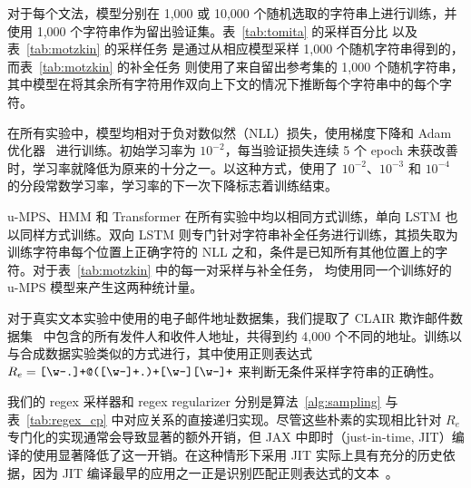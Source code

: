 \documentclass[twoside]{article}
\begin{document}
对于每个文法，模型分别在 1,000 或 10,000 个随机选取的字符串上进行训练，并使用 1,000 个字符串作为留出验证集。表~\ref{tab:tomita} 的采样百分比
以及表~\ref{tab:motzkin} 的采样任务
是通过从相应模型采样 1,000 个随机字符串得到的，而表~\ref{tab:motzkin} 的补全任务
则使用了来自留出参考集的 1,000 个随机字符串，其中模型在将其余所有字符用作双向上下文的情况下推断每个字符串中的每个字符。

在所有实验中，模型均相对于负对数似然（NLL）损失，使用梯度下降和 Adam 优化器~\citep{kingma2015} 进行训练。初始学习率为 $10^{-2}$，每当验证损失连续 5 个 epoch 未获改善时，学习率就降低为原来的十分之一。以这种方式，使用了 $10^{-2}$、$10^{-3}$ 和 $10^{-4}$ 的分段常数学习率，学习率的下一次下降标志着训练结束。

u-MPS、HMM 和 Transformer 在所有实验中均以相同方式训练，单向 LSTM 也以同样方式训练。双向 LSTM 则专门针对字符串补全任务进行训练，其损失取为训练字符串每个位置上正确字符的 NLL 之和，条件是已知所有其他位置上的字符。对于表~\ref{tab:motzkin} 中的每一对采样与补全任务，
均使用同一个训练好的 u-MPS 模型来产生这两种统计量。

对于真实文本实验中使用的电子邮件地址数据集，我们提取了 CLAIR 欺诈邮件数据集~\citep{radev2008} 中包含的所有发件人和收件人地址，共得到约 4,000 个不同的地址。训练以与合成数据实验类似的方式进行，其中使用正则表达式 $R_{e} = \verb![\w-.]+@([\w-]+.)+[\w-][\w-]+!$ 来判断无条件采样字符串的正确性。

我们的 regex 采样器和 regex regularizer 分别是算法~\ref{alg:sampling} 与表~\ref{tab:regex_cp} 中对应关系的直接递归实现。尽管这些朴素的实现相比针对 $R_e$ 专门化的实现通常会导致显著的额外开销，但 JAX 中即时（just-in-time, JIT）编译的使用显著降低了这一开销。在这种情形下采用 JIT 实际上具有充分的历史依据，因为 JIT 编译最早的应用之一正是识别匹配正则表达式的文本~\citep{thompson1968}。

% 
% 

\end{document}
